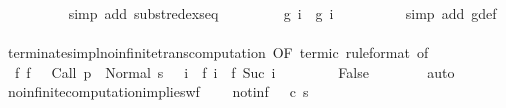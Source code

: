 \begin{isabellebody}
\ \ \ \ \ \ \ \ \isamarkupfalse%
\ {\isacharparenleft}simp\ add{\isacharcolon}\ subst{\isacharunderscore}redex{\isacharunderscore}seq{\isacharparenright}\isanewline
\ \ \ \ \ \ \isamarkupfalse%
\ {\isachardoublequoteopen}{\isasymGamma}{\isasymturnstile}\ {\isacharparenleft}g\ i{\isacharparenright}\ {\isasymrightarrow}\isactrlsup {\isacharplus}\ {\isacharparenleft}g\ {\isacharparenleft}i{\isacharplus}{}{\isacharparenright}{\isacharparenright}{\isachardoublequoteclose}\isanewline
\ \ \ \ \ \ \ \ \isamarkupfalse%
\ {\isacharparenleft}simp\ add{\isacharcolon}\ g{\isacharunderscore}def{\isacharparenright}\isanewline
\ \ \ \ \isamarkupfalse%
\isanewline
\ \ \ \ \isamarkupfalse%
\isanewline
\ \ \ \ \isamarkupfalse%
\ terminates{\isacharunderscore}impl{\isacharunderscore}no{\isacharunderscore}infinite{\isacharunderscore}trans{\isacharunderscore}computation\ {\isacharbrackleft}OF\ termi{\isacharunderscore}c\ {\isacharbrackleft}rule{\isacharunderscore}format{\isacharcomma}\ of\ {}{\isacharbrackright}{\isacharbrackright}\isanewline
\ \ \ \ \isamarkupfalse%
\ {\isachardoublequoteopen}{\isasymnot}\ {\isacharparenleft}{\isasymexists}f{\isachardot}\ f\ {}\ {\isacharequal}\ {\isacharparenleft}Call\ {\isacharparenleft}p\ {}{\isacharparenright}{\isacharcomma}\ Normal\ {\isacharparenleft}s\ {}{\isacharparenright}{\isacharparenright}\ {\isasymand}\ {\isacharparenleft}{\isasymforall}i{\isachardot}\ {\isasymGamma}{\isasymturnstile}\ f\ i\ {\isasymrightarrow}\isactrlsup {\isacharplus}\ f\ {\isacharparenleft}Suc\ i{\isacharparenright}{\isacharparenright}{\isacharparenright}{\isachardoublequoteclose}\ \isacommand{{\isachardot}}\isamarkupfalse%
\isanewline
\ \ \ \ \isamarkupfalse%
\ \isamarkupfalse%
\ False\isanewline
\ \ \ \ \ \ \isamarkupfalse%
\ auto\isanewline
\ \ \isamarkupfalse%
\isanewline
{}\isamarkupfalse%
%
\endisatagproof
{\isafoldproof}%
%
\isadelimproof
\isanewline
%
\endisadelimproof
\isanewline
\isanewline
{}\isamarkupfalse%
\ no{\isacharunderscore}infinite{\isacharunderscore}computation{\isacharunderscore}implies{\isacharunderscore}wf{\isacharcolon}\ \isanewline
\ \ \ not{\isacharunderscore}inf{\isacharcolon}\ {\isachardoublequoteopen}{\isasymnot}\ {\isasymGamma}{\isasymturnstile}\ {\isacharparenleft}c{\isacharcomma}\ s{\isacharparenright}\ {\isasymrightarrow}\ {\isasymdots}{\isacharparenleft}{\isasyminfinity}{\isacharparenright}{\isachardoublequoteclose}\isanewline

\end{isabellebody}
